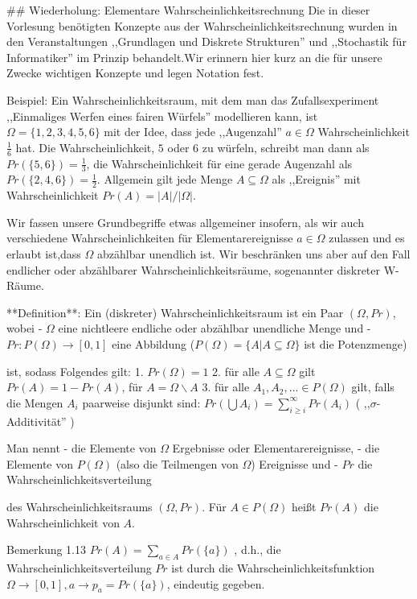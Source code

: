\documentclass[a4paper]{article}
\begin{document}
\begin{multicols}{3}
## Wiederholung: Elementare Wahrscheinlichkeitsrechnung
Die in dieser Vorlesung benötigten Konzepte aus der Wahrscheinlichkeitsrechnung wurden in den Veranstaltungen ,,Grundlagen und Diskrete Strukturen'' und ,,Stochastik für Informatiker'' im Prinzip behandelt.Wir erinnern hier kurz an die für unsere Zwecke wichtigen Konzepte und legen Notation fest.

Beispiel: Ein Wahrscheinlichkeitsraum, mit dem man das Zufallsexperiment ,,Einmaliges Werfen eines fairen Würfels'' modellieren kann, ist $\Omega=\{ 1 , 2 , 3 , 4 , 5 , 6\}$ mit der Idee, dass jede  ,,Augenzahl'' $a\in\Omega$ Wahrscheinlichkeit $\frac{1}{6}$ hat. Die Wahrscheinlichkeit, $5$ oder $6$ zu würfeln, schreibt man dann als $Pr(\{5,6\})=\frac{1}{3}$, die Wahrscheinlichkeit für eine gerade Augenzahl als $Pr(\{2,4,6\})=\frac{1}{2}$. Allgemein gilt jede Menge $A\subseteq\Omega$ als ,,Ereignis''  mit Wahrscheinlichkeit $Pr(A) =|A|/|\Omega|$.

Wir fassen unsere Grundbegriffe etwas allgemeiner insofern, als wir auch verschiedene Wahrscheinlichkeiten für Elementarereignisse $a\in\Omega$ zulassen und es erlaubt ist,dass $\Omega$ abzählbar unendlich ist. Wir beschränken uns aber auf den Fall endlicher oder abzählbarer Wahrscheinlichkeitsräume, sogenannter diskreter W-Räume. 

**Definition**: Ein (diskreter) Wahrscheinlichkeitsraum ist ein Paar $(\Omega,Pr)$, wobei
- $\Omega$ eine nichtleere endliche oder abzählbar unendliche Menge und
- $Pr:P(\Omega)\rightarrow[0,1]$ eine Abbildung ($P(\Omega)=\{A|A\subseteq\Omega\}$ ist die Potenzmenge)

ist, sodass Folgendes gilt:
1. $Pr(\Omega) = 1$
2. für alle $A\subseteq\Omega$ gilt $Pr(A)=1-Pr(A)$, für $A=\Omega\backslash A$
3. für alle $A_1,A_2,...\in P(\Omega)$ gilt, falls die Mengen $A_i$ paarweise disjunkt sind: $Pr(\bigcup A_i)=\sum_{i\geq i}^{\infty} Pr(A_i)$ ( ,,$\sigma$-Additivität'' )

Man nennt
- die Elemente von $\Omega$ Ergebnisse oder Elementarereignisse,
- die Elemente von $P(\Omega)$ (also die Teilmengen von $\Omega$) Ereignisse und
- $Pr$ die Wahrscheinlichkeitsverteilung

des Wahrscheinlichkeitsraums $(\Omega,Pr)$. Für $A\in P(\Omega)$ heißt $Pr(A)$ die Wahrscheinlichkeit von $A$.

Bemerkung 1.13 $Pr(A) =\sum_{a\in A} Pr(\{a\})$ , d.h., die Wahrscheinlichkeitsverteilung $Pr$ ist durch die Wahrscheinlichkeitsfunktion $\Omega\rightarrow[0,1],a \rightarrow p_a= Pr(\{a\})$, eindeutig gegeben.


\end{multicols}
\end{document}
